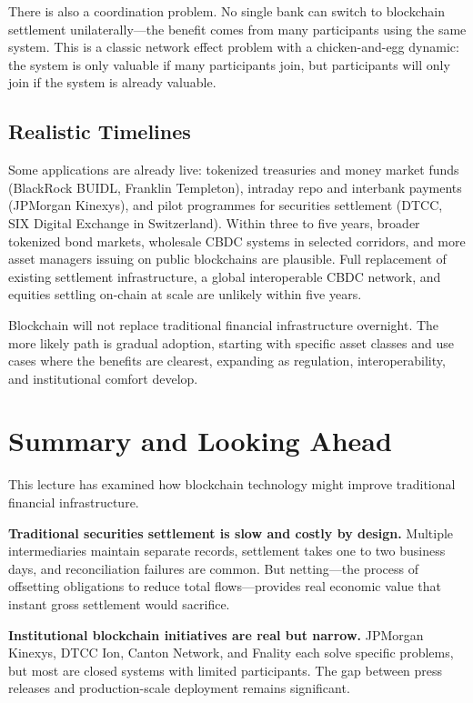\documentclass[11pt,a4paper]{article}
\begin{document}
There is also a coordination problem. No single bank can switch to blockchain settlement unilaterally---the benefit comes from many participants using the same system. This is a classic network effect problem with a chicken-and-egg dynamic: the system is only valuable if many participants join, but participants will only join if the system is already valuable.

\subsection{Realistic Timelines}

Some applications are already live: tokenized treasuries and money market funds (BlackRock BUIDL, Franklin Templeton), intraday repo and interbank payments (JPMorgan Kinexys), and pilot programmes for securities settlement (DTCC, SIX Digital Exchange in Switzerland). Within three to five years, broader tokenized bond markets, wholesale CBDC systems in selected corridors, and more asset managers issuing on public blockchains are plausible. Full replacement of existing settlement infrastructure, a global interoperable CBDC network, and equities settling on-chain at scale are unlikely within five years.

Blockchain will not replace traditional financial infrastructure overnight. The more likely path is gradual adoption, starting with specific asset classes and use cases where the benefits are clearest, expanding as regulation, interoperability, and institutional comfort develop.

\section{Summary and Looking Ahead}

This lecture has examined how blockchain technology might improve traditional financial infrastructure.

\textbf{Traditional securities settlement is slow and costly by design.} Multiple intermediaries maintain separate records, settlement takes one to two business days, and reconciliation failures are common. But netting---the process of offsetting obligations to reduce total flows---provides real economic value that instant gross settlement would sacrifice.

\textbf{Institutional blockchain initiatives are real but narrow.} JPMorgan Kinexys, DTCC Ion, Canton Network, and Fnality each solve specific problems, but most are closed systems with limited participants. The gap between press releases and production-scale deployment remains significant.
\end{document}
